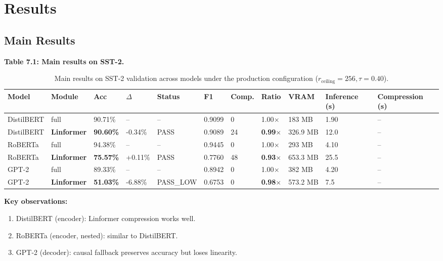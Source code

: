 \section{Results}

\subsection{Main Results}

\textbf{Table 7.1: Main results on SST-2.}

\begin{table}[t]
\centering
\small
\begin{tabular}{lllllllllll}
\toprule
\textbf{Model} & \textbf{Module} & \textbf{Acc} & \textbf{$\Delta$} & \textbf{Status} & \textbf{F1} & \textbf{Comp.} & \textbf{Ratio} & \textbf{VRAM} & \textbf{Inference (s)} & \textbf{Compression (s)} \\
\midrule
DistilBERT & full & 90.71\% & -- & -- & 0.9099 & 0 & 1.00$\times$ & 183 MB & 1.90 & -- \\
DistilBERT & \textbf{Linformer} & \textbf{90.60\%} & -0.34\% & PASS & 0.9089 & 24 & \textbf{0.99$\times$} & 326.9 MB & 12.0 & -- \\
RoBERTa & full & 94.38\% & -- & -- & 0.9445 & 0 & 1.00$\times$ & 293 MB & 4.10 & -- \\
RoBERTa & \textbf{Linformer} & \textbf{75.57\%} & +0.11\% & PASS & 0.7760 & 48 & \textbf{0.93$\times$} & 653.3 MB & 25.5 & -- \\
GPT-2 & full & 89.33\% & -- & -- & 0.8942 & 0 & 1.00$\times$ & 382 MB & 4.20 & -- \\
GPT-2 & \textbf{Linformer} & \textbf{51.03\%} & -6.88\% & PASS\_LOW & 0.6753 & 0 & \textbf{0.98$\times$} & 573.2 MB & 7.5 & -- \\
\bottomrule
\end{tabular}
\caption{Main results on SST-2 validation across models under the production configuration ($r_{\mathrm{ceiling}}=256, \tau=0.40$).}
\label{tab:main_sst2}
\end{table}

\textbf{Key observations:}

\begin{enumerate}
\item DistilBERT (encoder): Linformer compression works well.
\item RoBERTa (encoder, nested): similar to DistilBERT.
\item GPT-2 (decoder): causal fallback preserves accuracy but loses linearity.

\end{enumerate}
